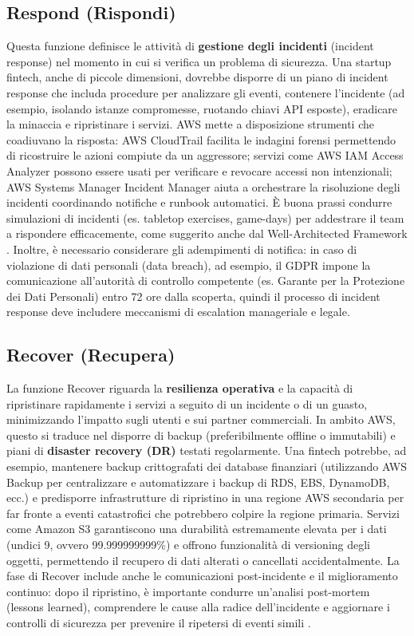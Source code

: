 \subsection{Respond (Rispondi)}
\label{subsec:nist_csf_respond}
Questa funzione definisce le attività di \textbf{gestione degli incidenti} (incident response) nel momento in cui si verifica un problema di sicurezza. Una startup fintech, anche di piccole dimensioni, dovrebbe disporre di un piano di incident response che includa procedure per analizzare gli eventi, contenere l'incidente (ad esempio, isolando istanze compromesse, ruotando chiavi API esposte), eradicare la minaccia e ripristinare i servizi. AWS mette a disposizione strumenti che coadiuvano la risposta: AWS CloudTrail facilita le indagini forensi permettendo di ricostruire le azioni compiute da un aggressore; servizi come AWS IAM Access Analyzer possono essere usati per verificare e revocare accessi non intenzionali; AWS Systems Manager Incident Manager aiuta a orchestrare la risoluzione degli incidenti coordinando notifiche e runbook automatici. È buona prassi condurre simulazioni di incidenti (es. tabletop exercises, game-days) per addestrare il team a rispondere efficacemente, come suggerito anche dal Well-Architected Framework \cite{awsWellArchitected}. Inoltre, è necessario considerare gli adempimenti di notifica: in caso di violazione di dati personali (data breach), ad esempio, il GDPR impone la comunicazione all'autorità di controllo competente (es. Garante per la Protezione dei Dati Personali) entro 72 ore dalla scoperta, quindi il processo di incident response deve includere meccanismi di escalation manageriale e legale.

\subsection{Recover (Recupera)}
\label{subsec:nist_csf_recover}
La funzione Recover riguarda la \textbf{resilienza operativa} e la capacità di ripristinare rapidamente i servizi a seguito di un incidente o di un guasto, minimizzando l'impatto sugli utenti e sui partner commerciali. In ambito AWS, questo si traduce nel disporre di backup (preferibilmente offline o immutabili) e piani di \textbf{disaster recovery (DR)} testati regolarmente. Una fintech potrebbe, ad esempio, mantenere backup crittografati dei database finanziari (utilizzando AWS Backup per centralizzare e automatizzare i backup di RDS, EBS, DynamoDB, ecc.) e predisporre infrastrutture di ripristino in una regione AWS secondaria per far fronte a eventi catastrofici che potrebbero colpire la regione primaria. Servizi come Amazon S3 garantiscono una durabilità estremamente elevata per i dati (undici 9, ovvero 99.999999999\%) e offrono funzionalità di versioning degli oggetti, permettendo il recupero di dati alterati o cancellati accidentalmente. La fase di Recover include anche le comunicazioni post-incidente e il miglioramento continuo: dopo il ripristino, è importante condurre un'analisi post-mortem (lessons learned), comprendere le cause alla radice dell'incidente e aggiornare i controlli di sicurezza per prevenire il ripetersi di eventi simili \cite{awsWhitepaperCSF2}.

